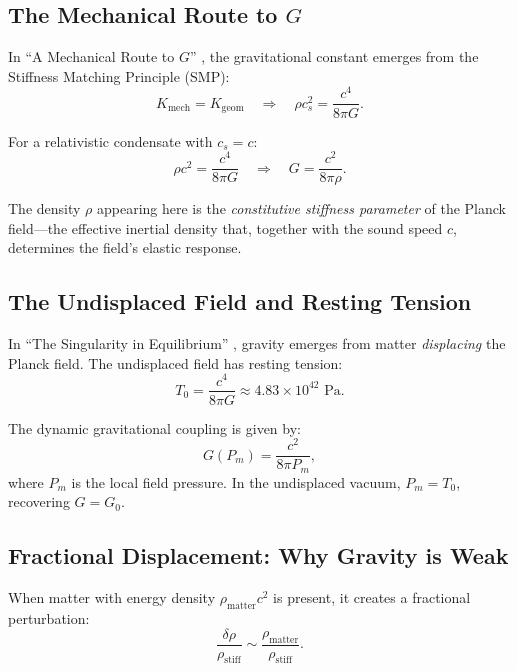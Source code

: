 \documentclass[11pt,a4paper]{article}
\newcommand{\ee}[1]{\times 10^{#1}}
\newcommand{\rhostiff}{\ensuremath{\rho_{\mathrm{stiff}}}}
\newcommand{\Tzero}{\ensuremath{T_0}}
\theoremstyle{definition}
\begin{document}
\subsection{The Mechanical Route to $G$}
\label{sec:mechanical_G}

In ``A Mechanical Route to $G$'' \cite{SkavbergMechG2025}, the gravitational constant emerges from the Stiffness Matching Principle (SMP):
\begin{equation}
\label{eq:SMP}
K_{\mathrm{mech}} = K_{\mathrm{geom}} \quad \Rightarrow \quad \rho c_s^2 = \frac{c^4}{8\pi G}.
\end{equation}

For a relativistic condensate with $c_s = c$:
\begin{equation}
\label{eq:SMP_relativistic}
\rho c^2 = \frac{c^4}{8\pi G} \quad \Rightarrow \quad G = \frac{c^2}{8\pi \rho}.
\end{equation}

The density $\rho$ appearing here is the \emph{constitutive stiffness parameter} of the Planck field---the effective inertial density that, together with the sound speed $c$, determines the field's elastic response.

\subsection{The Undisplaced Field and Resting Tension}
\label{sec:undisplaced}

In ``The Singularity in Equilibrium'' \cite{SkavbergMechGR2025}, gravity emerges from matter \emph{displacing} the Planck field. The undisplaced field has resting tension:
\begin{equation}
\label{eq:T0_undisplaced}
\Tzero = \frac{c^4}{8\pi G} \approx 4.83 \ee{42} \text{ Pa}.
\end{equation}

The dynamic gravitational coupling is given by:
\begin{equation}
\label{eq:G_dynamic}
G(P_m) = \frac{c^2}{8\pi P_m},
\end{equation}
where $P_m$ is the local field pressure. In the undisplaced vacuum, $P_m = \Tzero$, recovering $G = G_0$.

\subsection{Fractional Displacement: Why Gravity is Weak}
\label{sec:fractional_displacement}

When matter with energy density $\rho_{\mathrm{matter}} c^2$ is present, it creates a fractional perturbation:
\begin{equation}
\label{eq:fractional_perturbation}
\frac{\delta \rho}{\rhostiff} \sim \frac{\rho_{\mathrm{matter}}}{\rhostiff}.
\end{equation}
\end{document}
